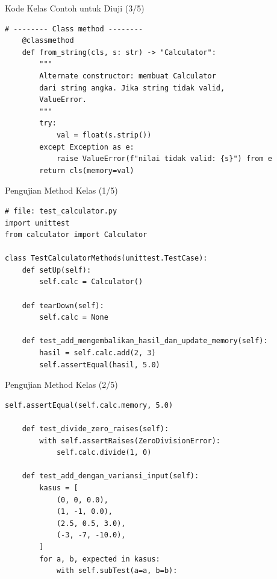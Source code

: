 \documentclass[aspectratio=169, table]{beamer}
\begin{document}
\begin{frame}[fragile]{Kode Kelas Contoh untuk Diuji (3/5)}
\vspace*{20pt}
\begin{lstlisting}[style=PythonStyle]
    # -------- Class method --------
    @classmethod
    def from_string(cls, s: str) -> "Calculator":
        """
        Alternate constructor: membuat Calculator 
        dari string angka. Jika string tidak valid, 
        ValueError.
        """
        try:
            val = float(s.strip())
        except Exception as e:
            raise ValueError(f"nilai tidak valid: {s}") from e
        return cls(memory=val)
\end{lstlisting}
\end{frame}

\begin{frame}[fragile]{Pengujian Method Kelas (1/5)}
\vspace*{20pt}
\begin{lstlisting}[style=PythonStyle]
# file: test_calculator.py
import unittest
from calculator import Calculator

class TestCalculatorMethods(unittest.TestCase):
    def setUp(self):
        self.calc = Calculator()

    def tearDown(self):
        self.calc = None

    def test_add_mengembalikan_hasil_dan_update_memory(self):
        hasil = self.calc.add(2, 3)
        self.assertEqual(hasil, 5.0)
\end{lstlisting}
\end{frame}

\begin{frame}[fragile]{Pengujian Method Kelas (2/5)}
\vspace*{20pt}
\begin{lstlisting}[style=PythonStyle]
        self.assertEqual(self.calc.memory, 5.0)

    def test_divide_zero_raises(self):
        with self.assertRaises(ZeroDivisionError):
            self.calc.divide(1, 0)

    def test_add_dengan_variansi_input(self):
        kasus = [
            (0, 0, 0.0),
            (1, -1, 0.0),
            (2.5, 0.5, 3.0),
            (-3, -7, -10.0),
        ]
        for a, b, expected in kasus:
            with self.subTest(a=a, b=b):
\end{lstlisting}
\end{frame}
\end{document}
